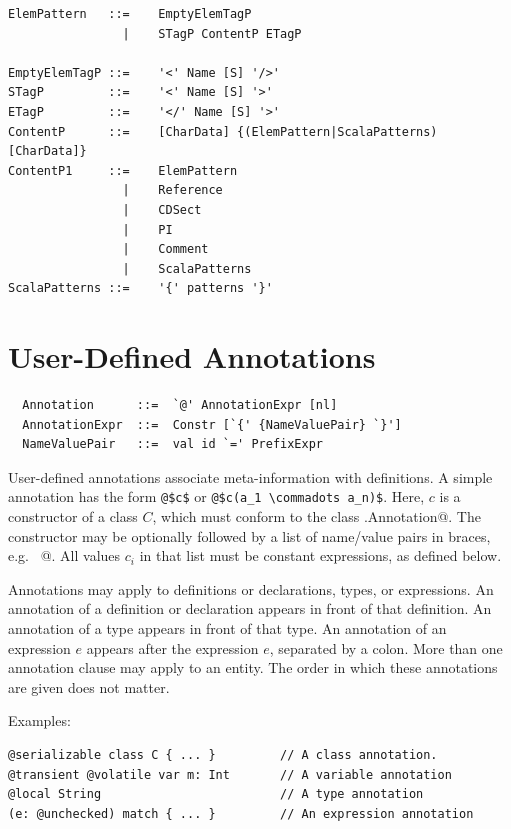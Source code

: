{\syntax\begin{lstlisting}
ElemPattern   ::=    EmptyElemTagP
                |    STagP ContentP ETagP                                    

EmptyElemTagP ::=    '<' Name [S] '/>'
STagP         ::=    '<' Name [S] '>'                          
ETagP         ::=    '</' Name [S] '>'                                        
ContentP      ::=    [CharData] {(ElemPattern|ScalaPatterns) [CharData]}
ContentP1     ::=    ElemPattern
                |    Reference
                |    CDSect
                |    PI
                |    Comment
                |    ScalaPatterns
ScalaPatterns ::=    '{' patterns '}'
\end{lstlisting}


\chapter{User-Defined Annotations}
\label{sec:annotations}

\syntax\begin{lstlisting}
  Annotation      ::=  `@' AnnotationExpr [nl]
  AnnotationExpr  ::=  Constr [`{' {NameValuePair} `}']
  NameValuePair   ::=  val id `=' PrefixExpr
\end{lstlisting}

User-defined annotations associate meta-information with definitions.
A simple annotation has the form \lstinline^@$c$^ or
\lstinline^@$c(a_1 \commadots a_n)$^.  
Here, $c$ is a constructor of a class $C$, which must conform
to the class \lstinline@scala.Annotation@. 
The
constructor may be optionally followed by a list of name/value pairs
in braces, e.g.  ~@. All
values $c_i$ in that list must be constant expressions, as defined below.

Annotations may apply to definitions or declarations, types, or
expressions.  An annotation of a definition or declaration appears in
front of that definition.  An annotation of a type appears in front of
that type. An annotation of an expression $e$ appears after the
expression $e$, separated by a colon. More than one annotation clause
may apply to an entity. The order in which these annotations are given
does not matter.

Examples:
\begin{lstlisting}
@serializable class C { ... }         // A class annotation.
@transient @volatile var m: Int       // A variable annotation
@local String                         // A type annotation
(e: @unchecked) match { ... }         // An expression annotation
\end{lstlisting}

}
